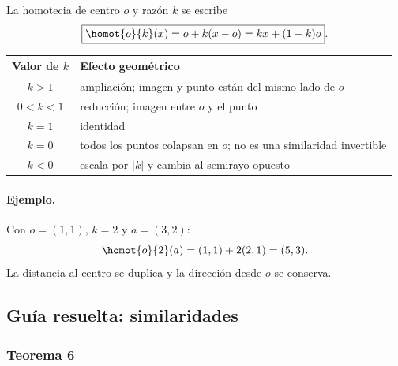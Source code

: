 La homotecia de centro \(o\) y razón \(k\) se escribe
\[
  \boxed{\homot{o}{k}(x)=o+k(x-o)=kx+(1-k)o}.
\]

\begin{center}
\end{center}

\begin{center}
\begin{tabularx}{.92\textwidth}{>{\bfseries}c X}
\toprule
Valor de \(k\) & Efecto geométrico\\
\midrule
\(k>1\) & ampliación; imagen y punto están del mismo lado de \(o\)\\
\(0<k<1\) & reducción; imagen entre \(o\) y el punto\\
\(k=1\) & identidad\\
\(k=0\) & todos los puntos colapsan en \(o\); no es una similaridad invertible\\
\(k<0\) & escala por \(|k|\) y cambia al semirayo opuesto\\
\bottomrule
\end{tabularx}
\end{center}

\paragraph{Ejemplo.}
Con \(o=(1,1)\), \(k=2\) y \(a=(3,2)\):
\[
  \homot{o}{2}(a)=(1,1)+2(2,1)=(5,3).
\]
La distancia al centro se duplica y la dirección desde \(o\) se conserva.

\subsection{Guía resuelta: similaridades}

\subsubsection{Teorema 6}

